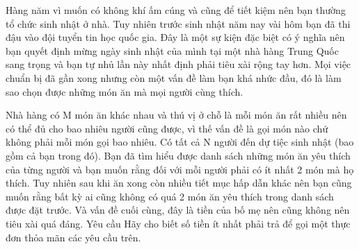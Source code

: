 Hàng năm vì muốn có không khí ấm cúng và cũng để tiết kiệm nên bạn thường tổ chức sinh nhật ở nhà. Tuy nhiên trước sinh nhật năm nay vài hôm bạn đã thi đậu vào đội tuyển tin học quốc gia. Đây là một sự kiện đặc biệt có ý nghĩa nên bạn quyết định mừng ngày sinh nhật của mình tại một nhà hàng Trung Quốc sang trọng và bạn tự nhủ lần này nhất định phải tiêu xài rộng tay hơn. Mọi việc chuẩn bị đã gần xong nhưng còn một vấn đề làm bạn khá nhức đầu, đó là làm sao chọn được những món ăn mà mọi người cùng thích.  

   Nhà hàng có M món ăn khác nhau và thú vị ở chỗ là mỗi món ăn rất nhiều nên có thể đủ cho bao nhiêu người cũng được, vì thế vấn đề là gọi món nào chứ không phải mỗi món gọi bao nhiêu. Có tất cả N người đến dự tiệc sinh nhật (bao gồm cả bạn trong đó). Bạn đã tìm hiểu được danh sách những món ăn yêu thích của từng người và bạn muốn rằng đối với mỗi người phải có ít nhất 2 món mà họ thích. Tuy nhiên sau khi ăn xong còn nhiều tiết mục hấp dẫn khác nên bạn cũng muốn rằng bất kỳ ai cũng không có quá 2 món ăn yêu thích trong danh sách được đặt trước. Và vấn đề cuối cùng, đây là tiền của bố mẹ nên cũng không nên tiêu xài quá đáng.
   Yêu cầu  
Hãy cho biết số tiền ít nhất phải trả để gọi một thực đơn thỏa mãn các yêu cầu trên.
